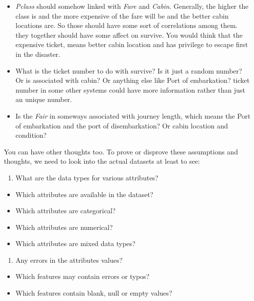 \documentclass[
]{book}
\providecommand{\tightlist}{%
  \setlength{\itemsep}{0pt}\setlength{\parskip}{0pt}}
\begin{document}
\begin{itemize}
\item
  \emph{Pclass} should somehow linked with \emph{Fare} and \emph{Cabin}. Generally, the higher the class is and the more expensive of the fare will be and the better cabin locations are. So those should have some sort of correlations among them. they together should have some affect on survive. You would think that the expensive ticket, means better cabin location and has privilege to escape first in the disaster.
\item
  What is the ticket number to do with survive? Is it just a random number? Or is associated with cabin? Or anything else like Port of embarkation? ticket number in some other systems could have more information rather than just an unique number.
\item
  Is the \emph{Fair} in someways associated with journey length, which means the Port of embarkation and the port of disembarkation? Or cabin location and condition?
\end{itemize}

You can have other thoughts too. To prove or disprove these assumptions and thoughts, we need to look into the actual datasets at least to see:

\begin{enumerate}
\def\labelenumi{\arabic{enumi}.}
\tightlist
\item
  What are the data types for various attributes?
\end{enumerate}

\begin{itemize}
\tightlist
\item
  Which attributes are available in the dataset?
\item
  Which attributes are categorical?
\item
  Which attributes are numerical?
\item
  Which attributes are mixed data types?
\end{itemize}

\begin{enumerate}
\def\labelenumi{\arabic{enumi}.}
\setcounter{enumi}{1}
\tightlist
\item
  Any errors in the attributes values?
\end{enumerate}

\begin{itemize}
\tightlist
\item
  Which features may contain errors or typos?
\item
  Which features contain blank, null or empty values?
\end{itemize}
\end{document}
